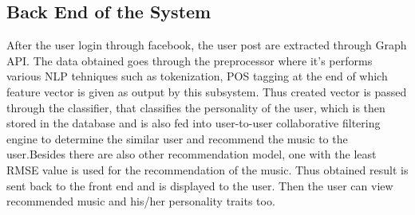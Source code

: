 \newpage
\subsection{Back End of the System}
After the user login through facebook, the user post are extracted through Graph API. The data obtained goes through the preprocessor where it's performs various NLP tehniques such as tokenization, POS tagging at the end of which feature vector is given as output by this subsystem. Thus created vector is passed through the classifier, that classifies the personality of the user, which is then stored in the database and is also fed into user-to-user collaborative filtering engine to determine the similar user and recommend the music to the user.Besides there are also other recommendation model, one with the least RMSE value is used for the recommendation of the music. Thus obtained result is sent back to the front end and is displayed to the user. Then the user can view recommended music and his/her personality traits too.
